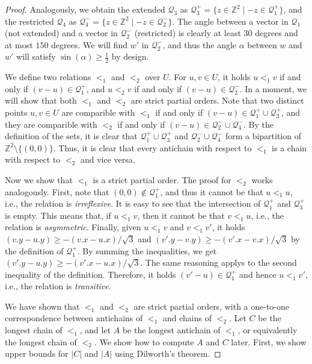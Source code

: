 \documentclass[11pt, letterpaper]{article}
\theoremstyle{plain}
\theoremstyle{definition}
\theoremstyle{remark}
\newcommand{\Q}{\mathcal{Q}}
\newcommand{\absolute}[1]{\left\lvert#1\right\rvert}
\begin{document}
\begin{proof}
%

%
Analogously, we obtain the extended $\Q_3$ as $\Q_3^+ = \{ z \in \mathbb Z^2 \mid -z \in \Q_1^+ \}$, and the restricted $\Q_4$ as $\Q_4^- = \{ z \in \mathbb Z^2 \mid -z \in \Q_2^- \}$. The angle between a vector in $\Q_1$ (not extended) and a vector in $\Q_2^-$ (restricted) is clearly at least $30$ degrees and at most $150$ degrees. We will find $w'$ in $\Q_2^-$, and thus the angle $\alpha$ between $w$ and $w'$ will satisfy $\sin(\alpha) \geq \frac12$ by design.

We define two relations $<_1$ and $<_2$ over $U$. For $u, v \in U$, it holds $u <_1 v$ if and only if $(v - u) \in \Q_1^+$, and $u <_2 v$ if and only if $(v - u) \in \Q_2^-$. In a moment, we will show that both $<_1$ and $<_2$ are strict partial orders. 
Note that two distinct points $u,v \in U$ are comparible with $<_1$ if and only if $(v - u) \in \Q_1^+ \cup \Q_3^+$, and they are comparible with $<_2$ if and only if $(v - u) \in \Q_2^- \cup \Q_4^-$. 
By the definition of the sets, it is clear that $\Q_1^+ \cup \Q_3^+$ and $\Q_2^- \cup \Q_4^-$ form a bipartition of $\mathbb Z^2 \setminus \{(0,0)\}$.
Thus, it is clear that every antichain with respect to $<_1$ is a chain with respect to $<_2$ and vice versa.

Now we show that $<_1$ is a strict partial order. The proof for $<_2$ works analogously. First, note that $(0,0) \notin \Q_1^+$, and thus it cannot be that $u <_1 u$, i.e., the relation is \emph{irreflexive}. It is easy to see that the intersection of $\Q_1^+$ and $\Q_3^+$ is empty. This means that, if $u <_1 v$, then it cannot be that $v <_1 u$, i.e., the relation is \emph{asymmetric}. Finally, given $u <_1 v$ and $v <_1 v'$, it holds $(v.y - u.y) \geq -(v.x-u.x)/\sqrt{3}$ and $(v'.y - v.y) \geq -(v'.x-v.x)/\sqrt{3}$ by the definition of $\Q_1^+$. By summing the inequalities, we get $(v'.y - u.y) \geq -(v'.x-u.x)/\sqrt{3}$. The same reasoning applys to the second inequality of the definition. Therefore, it holds $(v' - u) \in \Q_1^+$ and hence $u <_1 v'$, i.e., the relation is \emph{transitive}.

We have shown that $<_1$ and $<_2$ are strict partial orders, with a one-to-one correspondence between antichains of $<_1$ and chains of $<_2$.
Let $C$ be the longest chain of $<_1$, and let $A$ be the longest antichain of $<_1$, or equivalently the longest chain of $<_2$. We show how to compute $A$ and $C$ later. First, we show upper bounds for $\absolute{C}$ and $\absolute{A}$ using Dilworth's theorem.


\end{proof}
\end{document}
